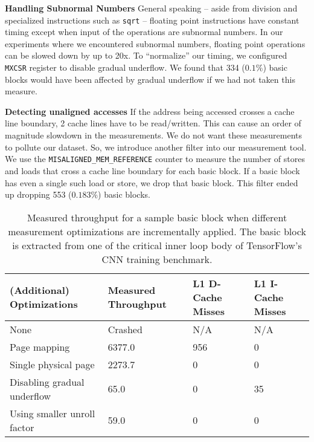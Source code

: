 \textbf{Handling Subnormal Numbers}
General speaking -- aside from division
and specialized instructions such as \verb|sqrt|
-- floating point instructions have constant timing
except when input of the operations are subnormal numbers.
In our experiments where we encountered subnormal numbers,
floating point operations can be slowed down by up to 20x.
To ``normalize'' our timing, we configured \verb|MXCSR| register
to disable gradual underflow.
We found that 334 ($0.1\%$) basic blocks would have been affected by 
gradual underflow if we had not taken this measure.


\textbf{Detecting unaligned accesses}
If the address being 
accessed crosses a cache line boundary, 2 cache lines have to be read/written. This can cause
an order of magnitude slowdown in the measurements. We do not want these measurements to 
pollute our dataset. So, we introduce another filter into our measurement tool. We use the 
\verb|MISALIGNED_MEM_REFERENCE| counter to measure the number of stores and loads that cross a cache line boundary for 
each basic block. If a basic block has even a single such load or store, we drop that basic block. 
This filter ended up dropping 553 ($0.183\%$) basic blocks. 

\begin{table}
\begin{tabular}{
|p{}|p{}|p{}|p{}|}
\hline \textbf{(Additional) Optimizations} &
\textbf{Measured Throughput} &
\textbf{L1 D-Cache Misses} &
\textbf{L1 I-Cache Misses} \\

\hline
None & Crashed & N/A & N/A \\

\hline
Page mapping & 6377.0 & 956 & 0 \\

\hline
Single physical page & 2273.7 & 0 & 0 \\

\hline
Disabling gradual underflow & 65.0 & 0 & 35 \\

\hline
Using smaller unroll factor & 59.0 & 0 & 0\\

\hline
\end{tabular}
\\
\caption{Measured throughput for a sample basic block when
different measurement optimizations are incrementally applied.
The basic block is extracted from one of the critical 
inner loop body of TensorFlow\cite{tensorflow}'s CNN training benchmark.}
\label{tab:ablation}
\end{table}